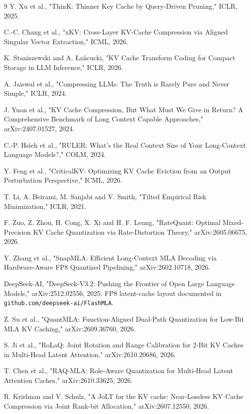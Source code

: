 \documentclass[11pt]{article}
\begin{document}
\begin{thebibliography}{9}
 Y. Xu et al., "ThinK: Thinner Key Cache by Query-Driven Pruning," ICLR, 2025.

 C.-C. Chang et al., "xKV: Cross-Layer KV-Cache Compression via Aligned Singular Vector Extraction," ICML, 2026.

 K. Staniszewski and A. Łańcucki, "KV Cache Transform Coding for Compact Storage in LLM Inference," ICLR, 2026.

 A. Jaiswal et al., "Compressing LLMs: The Truth is Rarely Pure and Never Simple," ICLR, 2024.

 J. Yuan et al., "KV Cache Compression, But What Must We Give in Return? A Comprehensive Benchmark of Long Context Capable Approaches," arXiv:2407.01527, 2024.

 C.-P. Hsieh et al., "RULER: What's the Real Context Size of Your Long-Context Language Models?," COLM, 2024.

 Y. Feng et al., "CriticalKV: Optimizing KV Cache Eviction from an Output Perturbation Perspective," ICML, 2026.

 T. Li, A. Beirami, M. Sanjabi and V. Smith, "Tilted Empirical Risk Minimization," ICLR, 2021.

 F. Zuo, Z. Zhou, H. Cong, X. Xi and H. F. Leung, "RateQuant: Optimal Mixed-Precision KV Cache Quantization via Rate-Distortion Theory," arXiv:2605.06675, 2026.

 Y. Zhang et al., "SnapMLA: Efficient Long-Context MLA Decoding via Hardware-Aware FP8 Quantized Pipelining," arXiv:2602.10718, 2026.

 DeepSeek-AI, "DeepSeek-V3.2: Pushing the Frontier of Open Large Language Models," arXiv:2512.02556, 2025. FP8 latent-cache layout documented in \texttt{github.com/\allowbreak deepseek-ai/\allowbreak FlashMLA}.

 Z. Su et al., "QuantMLA: Function-Aligned Dual-Path Quantization for Low-Bit MLA KV Caching," arXiv:2609.36760, 2026.

 S. Ji et al., "RoLaQ: Joint Rotation and Range Calibration for 2-Bit KV Caches in Multi-Head Latent Attention," arXiv:2610.20686, 2026.

 T. Chen et al., "RAQ-MLA: Role-Aware Quantization for Multi-Head Latent Attention Caches," arXiv:2610.33625, 2026.

 R. Krishnan and V. Schulz, "A JoLT for the KV cache: Near-Lossless KV Cache Compression via Joint Rank-bit Allocation," arXiv:2607.12550, 2026.


\end{thebibliography}
\end{document}
